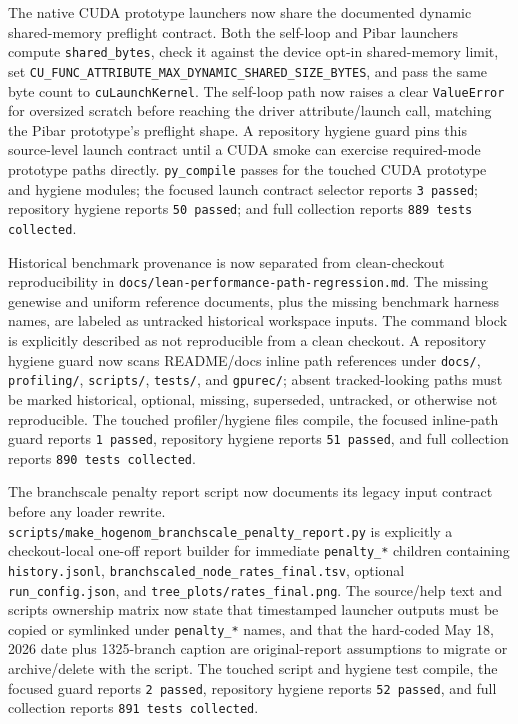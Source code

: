\documentclass[11pt]{article}
\begin{document}
The native CUDA prototype launchers now share the documented dynamic
shared-memory preflight contract.  Both the self-loop and Pibar launchers
compute \texttt{shared\_bytes}, check it against the device opt-in shared-memory
limit, set \texttt{CU\_FUNC\_ATTRIBUTE\_MAX\_DYNAMIC\_SHARED\_SIZE\_BYTES}, and
pass the same byte count to \texttt{cuLaunchKernel}.  The self-loop path now
raises a clear \texttt{ValueError} for oversized scratch before reaching the
driver attribute/launch call, matching the Pibar prototype's preflight shape.
A repository hygiene guard pins this source-level launch contract until a CUDA
smoke can exercise required-mode prototype paths directly.  \texttt{py\_compile}
passes for the touched CUDA prototype and hygiene modules; the focused launch
contract selector reports \texttt{3 passed}; repository hygiene reports
\texttt{50 passed}; and full collection reports \texttt{889 tests collected}.

Historical benchmark provenance is now separated from clean-checkout
reproducibility in \texttt{docs/lean-performance-path-regression.md}.  The
missing genewise and uniform reference documents, plus the missing benchmark
harness names, are labeled as untracked historical workspace inputs.  The
command block is explicitly described as not reproducible from a clean checkout.
A repository hygiene guard now scans README/docs inline path references under
\texttt{docs/}, \texttt{profiling/}, \texttt{scripts/}, \texttt{tests/}, and
\texttt{gpurec/}; absent tracked-looking paths must be marked historical,
optional, missing, superseded, untracked, or otherwise not reproducible.  The
touched profiler/hygiene files compile, the focused inline-path guard reports
\texttt{1 passed}, repository hygiene reports \texttt{51 passed}, and full
collection reports \texttt{890 tests collected}.

The branchscale penalty report script now documents its legacy input contract
before any loader rewrite.  \texttt{scripts/make\_hogenom\_branchscale\_penalty\_report.py}
is explicitly a checkout-local one-off report builder for immediate
\texttt{penalty\_*} children containing \texttt{history.jsonl},
\texttt{branchscaled\_node\_rates\_final.tsv}, optional
\texttt{run\_config.json}, and \texttt{tree\_plots/rates\_final.png}.  The
source/help text and scripts ownership matrix now state that timestamped
launcher outputs must be copied or symlinked under \texttt{penalty\_*} names,
and that the hard-coded May 18, 2026 date plus 1325-branch caption are
original-report assumptions to migrate or archive/delete with the script.  The
touched script and hygiene test compile, the focused guard reports
\texttt{2 passed}, repository hygiene reports \texttt{52 passed}, and full
collection reports \texttt{891 tests collected}.
\end{document}
